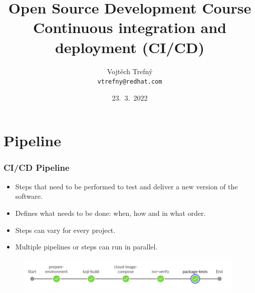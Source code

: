 \documentclass[aspectratio=169]{beamer}
\title[Open Source Development Course]{Open Source Development Course\\ \small Continuous integration and deployment (CI/CD)}
\author{Vojtěch Trefný\\ \small \texttt{vtrefny@redhat.com}\\}
\date{23.~3.~2022}
\institute{\faTwitter\, \href{https://twitter.com/vojtechtrefny}{twitter.com/vojtechtrefny} \\ \faGithub\, \href{https://github.com/vojtechtrefny}{github.com/vojtechtrefny} \\ \faGitlab\ \href{https://gitlab.com/vtrefny}{gitlab.com/vtrefny}}
\begin{document}
{ 
\begin{frame}
\titlepage
\end{frame}
}

\newcommand*\openquote{\makebox(25,-22){\scalebox{5}{``}}}
\newcommand*\closequote{\makebox(25,-22){\scalebox{5}{''}}}


\section{Pipeline}

\begin{frame}
	\frametitle{CI/CD Pipeline}

	\begin{block}{}
		\begin{itemize}
			\item Steps that need to be performed to test and deliver a new version of the software.
			\item Defines what needs to be done: when, how and in what order.
			\item Steps can vary for every project.
			\item Multiple pipelines or steps can run in parallel.
		\end{itemize}
	\end{block}
	
	\begin{figure}[ht!]
	\begin{center}
  	  \includegraphics[width=11cm]{img/fedora-pipeline.png}
	\end{center}
	\end{figure}
\end{frame}
\end{document}
